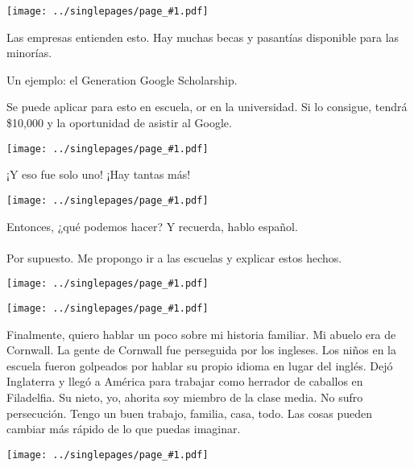 \documentclass[12pt]{article}
\newcommand{\cue}{\mbox{}\\
  \fbox{\sf Next slide}
\\}
\newcommand{\fig}[1]{
  \newpage  
  \begin{center}
    \texttt{[image: ../singlepages/page\_\#1.pdf]}
  \end{center}
  
}
\begin{document}
\fig{17}

Las empresas entienden esto.  Hay muchas becas y pasantías disponible
para las minorías.

Un ejemplo:  el Generation Google Scholarship.

Se puede aplicar para esto en escuela, or en la universidad.  Si lo
consigue, tendrá \$10,000 y la oportunidad de asistir al Google.

\fig{18}

¡Y eso fue solo uno!  ¡Hay tantas más!

\fig{20}

Entonces, ¿qué podemos hacer?  Y recuerda, hablo español.
\cue
Por supuesto.  Me propongo ir a las escuelas y explicar estos hechos. 

\fig{21}

\fig{22}

Finalmente, quiero hablar un poco sobre mi historia familiar.  Mi
abuelo era de Cornwall.  La gente de Cornwall fue perseguida por los
ingleses.  Los niños en la escuela fueron golpeados por hablar su
propio idioma en lugar del inglés.  Dejó Inglaterra y llegó a América
para trabajar como herrador de caballos en Filadelfia.  Su nieto, yo,
ahorita soy miembro de la clase media.  No sufro persecución.  Tengo
un buen trabajo, familia, casa, todo.  Las cosas pueden cambiar más
rápido de lo que puedas imaginar.


\fig{23}
\end{document}
